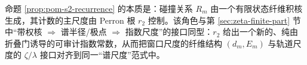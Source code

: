\begin{remark}\label{rem:pom-s2-zeta}
命题 \ref{prop:pom-s2-recurrence} 的本质是：碰撞关系 \(R_m\) 由一个有限状态纤维积核生成，其计数的主尺度由 Perron 根 \(r_2\) 控制。该角色与第 \ref{sec:zeta-finite-part} 节中“带权核 \(\Rightarrow\) 谱半径/极点 \(\Rightarrow\) 指数尺度”的接口同型：\(r_2\) 给出一个新的、纯由折叠门诱导的可审计指数常数，从而把窗口尺度的纤维结构 \((d_m,E_m)\) 与轨道尺度的 \(\zeta/\lambda\) 接口对齐到同一“谱尺度”范式中。
\end{remark}
